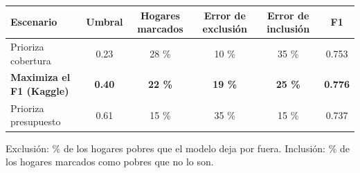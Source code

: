 
\begin{threeparttable}
\begin{tabular}[t]{lccccc}
\toprule
Escenario & Umbral & Hogares marcados & Error de exclusión & Error de inclusión & F1\\
\midrule
Prioriza cobertura & 0.23 & 28 \% & 10 \% & 35 \% & 0.753\\
\textbf{Maximiza el F1 (Kaggle)} & \textbf{0.40} & \textbf{22 \%} & \textbf{19 \%} & \textbf{25 \%} & \textbf{0.776}\\
Prioriza presupuesto & 0.61 & 15 \% & 35 \% & 15 \% & 0.737\\
\bottomrule
\end{tabular}
\begin{tablenotes}
\item Exclusión: \% de los hogares pobres que el modelo deja por fuera. Inclusión: \% de los hogares marcados como pobres que no lo son.
\end{tablenotes}
\end{threeparttable}
